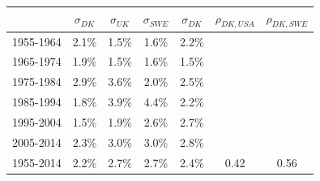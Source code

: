 \begin{table}[ht]
\centering
\begin{tabular}{lcccccc}
\hline
& $\sigma_{DK}$ & $\sigma_{UK}$ & $\sigma_{SWE}$ & $\sigma_{DK}$ & $\rho_{DK,USA}$ & $\rho_{DK,SWE}$ \\
\hline
1955-1964 & 2.1\% & 1.5\% & 1.6\% & 2.2\% &  &  \\
1965-1974 & 1.9\% & 1.5\% & 1.6\% & 1.5\% &  &  \\
1975-1984 & 2.9\% & 3.6\% & 2.0\% & 2.5\% &  &  \\
1985-1994 & 1.8\% & 3.9\% & 4.4\% & 2.2\% &  &  \\
1995-2004 & 1.5\% & 1.9\% & 2.6\% & 2.7\% &  &  \\
2005-2014 & 2.3\% & 3.0\% & 3.0\% & 2.8\% &  &  \\
1955-2014 & 2.2\% & 2.7\% & 2.7\% & 2.4\% & 0.42 & 0.56 \\
\hline
\end{tabular}
\end{table}